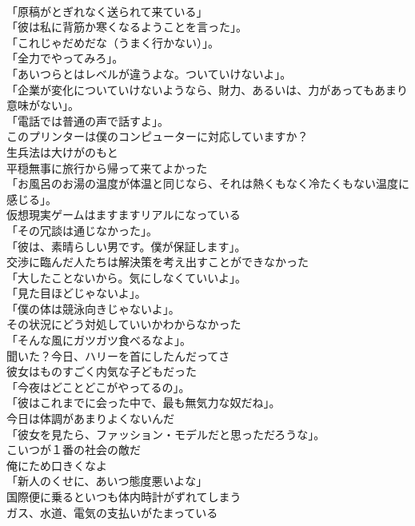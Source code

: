 \documentclass[8pt]{extreport}
\begin{document}
\begin{CJK}{UTF8}{min}
\\	「原稿がとぎれなく送られて来ている」	
\\	「彼は私に背筋か寒くなるようことを言った」。	
\\	「これじゃだめだな（うまく行かない）」。	
\\	「全力でやってみろ」。	
\\	「あいつらとはレベルが違うよな。ついていけないよ」。	
\\	「企業が変化についていけないようなら、財力、あるいは、力があってもあまり意味がない」。	
\\	「電話では普通の声で話すよ」。	
\\	このプリンターは僕のコンピューターに対応していますか？	
\\	生兵法は大けがのもと	
\\	平穏無事に旅行から帰って来てよかった	
\\	「お風呂のお湯の温度が体温と同じなら、それは熱くもなく冷たくもない温度に感じる」。	
\\	仮想現実ゲームはますますリアルになっている	
\\	「その冗談は通じなかった」。	
\\	「彼は、素晴らしい男です。僕が保証します」。	
\\	交渉に臨んだ人たちは解決策を考え出すことができなかった	
\\	「大したことないから。気にしなくていいよ」。	
\\	「見た目ほどじゃないよ」。	
\\	「僕の体は競泳向きじゃないよ」。	
\\	その状況にどう対処していいかわからなかった	
\\	「そんな風にガツガツ食べるなよ」。	
\\	聞いた？今日、ハリーを首にしたんだってさ	
\\	彼女はものすごく内気な子どもだった	
\\	「今夜はどことどこがやってるの」。	
\\	「彼はこれまでに会った中で、最も無気力な奴だね」。	
\\	今日は体調があまりよくないんだ	
\\	「彼女を見たら、ファッション・モデルだと思っただろうな」。	
\\	こいつが１番の社会の敵だ	
\\	俺にため口きくなよ	
\\	「新人のくせに、あいつ態度悪いよな」	
\\	国際便に乗るといつも体内時計がずれてしまう	
\\	ガス、水道、電気の支払いがたまっている	

\end{CJK}
\end{document}
